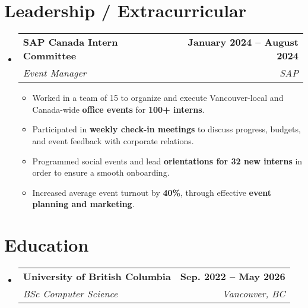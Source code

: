 \documentclass[letterpaper,11pt]{article}
\makeatletter
\newcommand{\resumeItem}[1]{
  \item\small{
    {#1 \vspace{-2pt}}
  }
}
\newcommand{\resumeSubheading}[4]{
  \vspace{-2pt}\item
    \begin{tabular*}{1.0\textwidth}[t]{l@{\extracolsep{\fill}}r}
      \textbf{#1} & \textbf{\small #2} \\
      \textit{\small#3} & \textit{\small #4} \\
    \end{tabular*}\vspace{-7pt}
}
\newcommand{\resumeSubHeadingListStart}{\begin{itemize}[leftmargin=0.0in, label={}]}
\newcommand{\resumeSubHeadingListEnd}{\end{itemize}}
\newcommand{\resumeItemListStart}{\begin{itemize}}
\newcommand{\resumeItemListEnd}{\end{itemize}\vspace{-5pt}}
\makeatother
\begin{document}
\section{Leadership / Extracurricular}
    \resumeSubHeadingListStart
        \resumeSubheading{SAP Canada Intern Committee}{January 2024 -- August 2024}{Event Manager}{SAP}
            \resumeItemListStart
                \resumeItem{Worked in a team of 15 to organize and execute Vancouver-local and Canada-wide \textbf{office events} for \textbf{} \textbf{100+ interns}.}
                \resumeItem{Participated in \textbf{weekly check-in meetings} to discuss progress, budgets, and event feedback with corporate relations.}
                \resumeItem{Programmed social events and lead \textbf{orientations for 32 new interns} in order to ensure a smooth onboarding.}
                \resumeItem{Increased average event turnout by \textbf{40\%}, through effective \textbf{event planning and marketing}.}
            \resumeItemListEnd
        
    \resumeSubHeadingListEnd

\section{Education}
  \resumeSubHeadingListStart
    \resumeSubheading
      {University of British Columbia}{Sep. 2022 -- May 2026}
      {BSc Computer Science}{Vancouver, BC}
  \resumeSubHeadingListEnd

%
\end{document}
